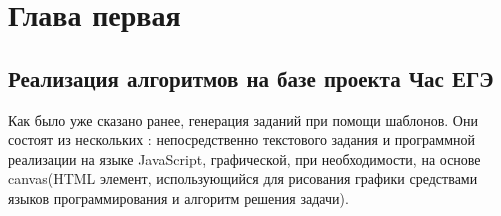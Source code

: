 
\section{Глава первая}
\subsection{Реализация алгоритмов на базе проекта Час ЕГЭ}
Как было уже сказано ранее, генерация заданий при помощи шаблонов. Они состоят из нескольких : непосредственно текстового задания и программной реализации на языке JavaScript, графической, при необходимости, на основе canvas(HTML элемент, использующийся для рисования графики средствами языков программирования и алгоритм решения задачи).

